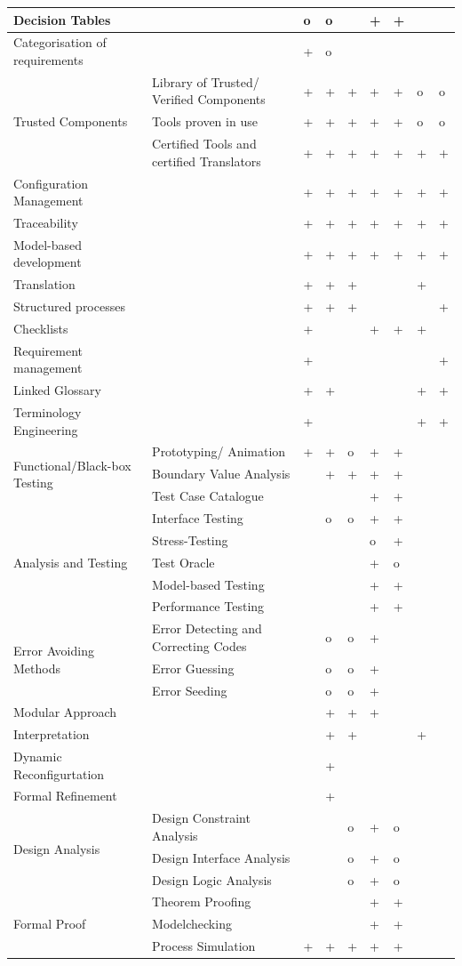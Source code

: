 \documentclass{./template/openetcs2}
\begin{document}
{\begin{longtable}{|m{4cm}|p{3.5cm}|m{0.6cm}|m{0.6cm}|m{0.3cm}|m{0.6cm}|m{0.3cm}|m{0.3cm}|m{0.6cm}|}
Decision Tables & & o & o & & + & + & & \\ \hline
Categorisation of requirements&&+&o&&&&&\\ \hline
\multirow{3}{4cm}{Trusted Components} &Library of Trusted/ Verified Components&+&+&+&+&+&o&o\\ \cline{2-9}
 &Tools proven in use&+&+&+&+&+&o&o\\ \cline{2-9}
 &Certified Tools and certified Translators&+&+&+&+&+&+&+\\ \hline
Configuration Management&&+&+&+&+&+&+&+\\ \hline
Traceability&&+&+&+&+&+&+&+\\ \hline
Model-based development&&+&+&+&+&+&+&+\\ \hline
Translation&&+&+&+&&&+&\\ \hline
Structured processes&&+&+&+&&&&+\\ \hline
Checklists&&+&&&+&+&+&\\ \hline
Requirement management&&+&&&&&&+\\ \hline
Linked Glossary&&+&+&&&&+&+\\ \hline
Terminology Engineering&&+&&&&&+&+\\ \hline
\multirow{3}{4cm}{Functional/Black-box Testing}&Prototyping/ Animation&+&+&o&+&+&&\\ \cline{2-9}
 &Boundary Value Analysis&&+&+&+&+&&\\ \cline{2-9}
 &Test Case Catalogue&&&&+&+&&\\ \hline
\multirow{5}{4cm}{Analysis and Testing}&Interface Testing&&o&o&+&+&&\\ \cline{2-9}
 &Stress-Testing&&&&o&+&&\\ \cline{2-9}
 &Test Oracle&&&&+&o&&\\ \cline{2-9}
 &Model-based Testing&&&&+&+&&\\ \cline{2-9}
 &Performance Testing&&&&+&+&&\\ \hline
\multirow{3}{4cm}{Error Avoiding Methods}&Error Detecting and Correcting Codes&&o&o&+&&&\\ \cline{2-9}
 &Error Guessing&&o&o&+&&&\\ \cline{2-9}
 &Error Seeding&&o&o&+&&&\\ \hline
Modular Approach&&&+&+&+&&&\\ \hline
Interpretation&&&+&+&&&+&\\ \hline
Dynamic Reconfigurtation&&&+&&&&&\\ \hline
Formal Refinement&&&+&&&&&\\ \hline
\multirow{3}{4cm}{Design Analysis}& Design Constraint Analysis&&&o&+&o&&\\ \cline{2-9}
 &Design Interface Analysis&&&o&+&o&&\\ \cline{2-9}
 &Design Logic Analysis&&&o&+&o&&\\ \hline
\multirow{3}{4cm}{Formal Proof}&Theorem Proofing&&&&+&+&&\\ \cline{2-9}
 &Modelchecking&&&&+&+&&\\ \cline{2-9} 
 &Process Simulation&+&+&+&+&+&&\\ \hline


\end{longtable}}
\end{document}
